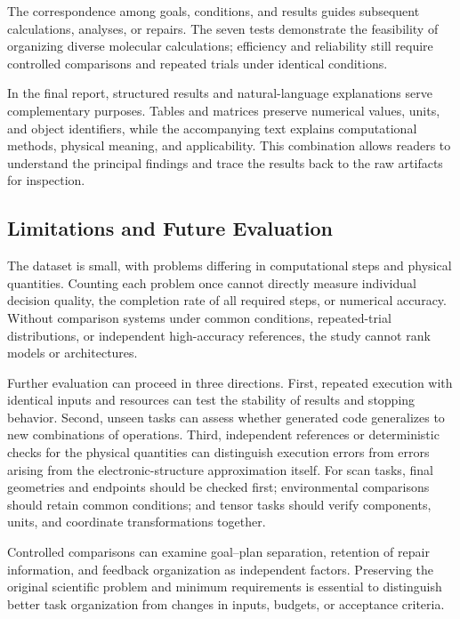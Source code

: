 \documentclass[a4paper,11pt]{article}
\begin{document}
The correspondence among goals, conditions, and results guides subsequent calculations, analyses, or repairs.
The seven tests demonstrate the feasibility of organizing diverse molecular calculations;
efficiency and reliability still require controlled comparisons and repeated trials under identical conditions.

In the final report, structured results and natural-language explanations serve complementary purposes.
Tables and matrices preserve numerical values, units, and object identifiers,
while the accompanying text explains computational methods, physical meaning, and applicability.
This combination allows readers to understand the principal findings and trace the results back to the raw artifacts for inspection.

\subsection{Limitations and Future Evaluation}
The dataset is small, with problems differing in computational steps and physical quantities.
Counting each problem once cannot directly measure individual decision quality, the completion rate of all required steps, or numerical accuracy.
Without comparison systems under common conditions, repeated-trial distributions, or independent high-accuracy references,
the study cannot rank models or architectures.

Further evaluation can proceed in three directions.
First, repeated execution with identical inputs and resources can test the stability of results and stopping behavior.
Second, unseen tasks can assess whether generated code generalizes to new combinations of operations.
Third, independent references or deterministic checks for the physical quantities can distinguish execution errors
from errors arising from the electronic-structure approximation itself.
For scan tasks, final geometries and endpoints should be checked first;
environmental comparisons should retain common conditions;
and tensor tasks should verify components, units, and coordinate transformations together.

Controlled comparisons can examine goal--plan separation, retention of repair information, and feedback organization as independent factors.
Preserving the original scientific problem and minimum requirements is essential
to distinguish better task organization from changes in inputs, budgets, or acceptance criteria.

\end{document}
